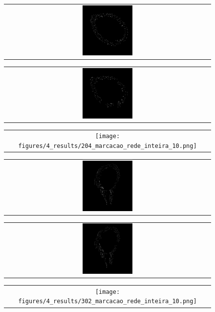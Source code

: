 \begin{figure}[H]
    \center
    \begin{tabular}{@{}c@{}}
        \includegraphics[width=0.25\textwidth]{figures/4_results/204_mask_manual_lower_res.png}
        \\[\abovecaptionskip]
    \end{tabular}
    \begin{tabular}{@{}c@{}}
        \includegraphics[width=0.25\textwidth]{figures/4_results/204_net_mask_lower_res.png}
        \\[\abovecaptionskip]
    \end{tabular}
    \begin{tabular}{@{}c@{}}
        \texttt{[image: figures/4\_results/204\_marcacao\_rede\_inteira\_10.png]}
        \\[\abovecaptionskip]
    \end{tabular}

    \begin{tabular}{@{}c@{}}
        \includegraphics[width=0.25\textwidth]{figures/4_results/302_mask_manual_lower_res.png}
        \\[\abovecaptionskip]
    \end{tabular}
    \begin{tabular}{@{}c@{}}
        \includegraphics[width=0.25\textwidth]{figures/4_results/302_net_mask_lower_res.png}
        \\[\abovecaptionskip]
    \end{tabular}
    \begin{tabular}{@{}c@{}}
        \texttt{[image: figures/4\_results/302\_marcacao\_rede\_inteira\_10.png]}
        \\[\abovecaptionskip]
    \end{tabular}
  

\end{figure}
